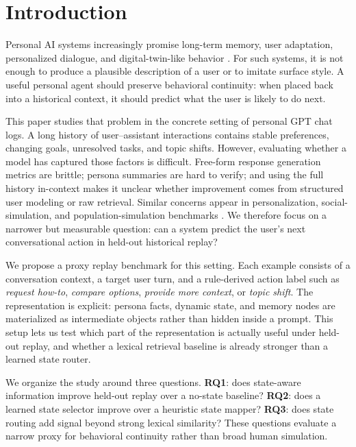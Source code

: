 \section{Introduction}

Personal AI systems increasingly promise long-term memory, user adaptation, personalized dialogue, and digital-twin-like behavior \cite{park2023generative,li2016persona,zhang2018personalizing,zhong2023memorybank,packer2023memgpt,zhang2024memorysurvey}. For such systems, it is not enough to produce a plausible description of a user or to imitate surface style. A useful personal agent should preserve behavioral continuity: when placed back into a historical context, it should predict what the user is likely to do next.

This paper studies that problem in the concrete setting of personal GPT chat logs. A long history of user--assistant interactions contains stable preferences, changing goals, unresolved tasks, and topic shifts. However, evaluating whether a model has captured those factors is difficult. Free-form response generation metrics are brittle; persona summaries are hard to verify; and using the full history in-context makes it unclear whether improvement comes from structured user modeling or raw retrieval. Similar concerns appear in personalization, social-simulation, and population-simulation benchmarks \cite{salemi2023lamp,zhou2023sotopia,wang2024sotopiapi,argyle2023outofone}. We therefore focus on a narrower but measurable question: can a system predict the user's next conversational action in held-out historical replay?

We propose a proxy replay benchmark for this setting. Each example consists of a conversation context, a target user turn, and a rule-derived action label such as \emph{request how-to}, \emph{compare options}, \emph{provide more context}, or \emph{topic shift}. The representation is explicit: persona facts, dynamic state, and memory nodes are materialized as intermediate objects rather than hidden inside a prompt. This setup lets us test which part of the representation is actually useful under held-out replay, and whether a lexical retrieval baseline is already stronger than a learned state router.

We organize the study around three questions. \textbf{RQ1}: does state-aware information improve held-out replay over a no-state baseline? \textbf{RQ2}: does a learned state selector improve over a heuristic state mapper? \textbf{RQ3}: does state routing add signal beyond strong lexical similarity? These questions evaluate a narrow proxy for behavioral continuity rather than broad human simulation.

